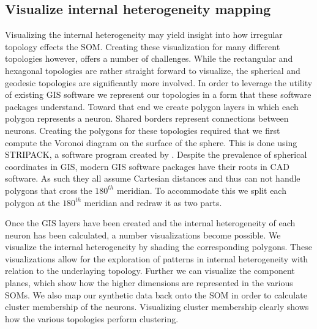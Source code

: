 \subsection{Visualize internal heterogeneity mapping}
Visualizing the internal heterogeneity may yield insight into how irregular topology
effects the SOM.  Creating these visualization for many different topologies
however, offers a number of challenges.  While the rectangular and hexagonal
topologies are rather straight forward to visualize, the spherical and geodesic
topologies are significantly more involved.  In order to leverage the utility
of existing GIS software we represent our topologies in a form that
these software packages understand.  Toward that end we create polygon layers
in which each polygon represents a neuron.  Shared borders represent
connections between neurons.  Creating the polygons for these topologies
required that we first compute the Voronoi diagram on the surface of the
sphere.  This is done using STRIPACK, a software program created by
\cite{Ranka97}.  Despite the prevalence of spherical coordinates
in GIS, modern GIS software packages have their roots in CAD software. As such
they all assume Cartesian distances and thus can not handle polygons that
cross the $180^{th}$ meridian.  To accommodate this we split each polygon at
the $180^{th}$ meridian and redraw it as two parts.

Once the GIS layers have been created and the internal heterogeneity of each
neuron has been calculated, a number visualizations become possible. We
visualize the internal heterogeneity by shading the corresponding polygons.
These visualizations allow for the exploration of patterns in internal
heterogeneity with relation to the underlaying topology.  Further we can
visualize the component planes, which show how the higher dimensions are
represented in the various SOMs.  We also map our synthetic data back onto the SOM in
order to calculate cluster membership of the neurons.  Visualizing cluster
membership clearly shows how the various topologies perform clustering.



